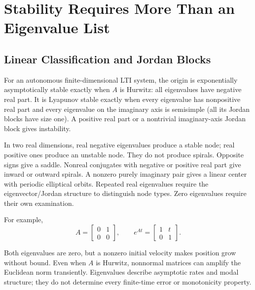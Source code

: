 \section{Stability Requires More Than an Eigenvalue List}
\label{sec:phase_portraits}
\label{thm:stability}
\label{thm:stability_classification}
\label{sec:equilibrium_summary}

\subsection{Linear Classification and Jordan Blocks}

For an autonomous finite-dimensional LTI system, the origin is exponentially asymptotically stable exactly when $A$ is Hurwitz: all eigenvalues have negative real part. It is Lyapunov stable exactly when every eigenvalue has nonpositive real part and every eigenvalue on the imaginary axis is semisimple (all its Jordan blocks have size one). A positive real part or a nontrivial imaginary-axis Jordan block gives instability.

In two real dimensions, real negative eigenvalues produce a stable node; real positive ones produce an unstable node. They do not produce spirals. Opposite signs give a saddle. Nonreal conjugates with negative or positive real part give inward or outward spirals. A nonzero purely imaginary pair gives a linear center with periodic elliptical orbits. Repeated real eigenvalues require the eigenvector/Jordan structure to distinguish node types. Zero eigenvalues require their own examination.

For example,
\begin{equation}
\label{eq:state_jordan_example}
 A=\begin{bmatrix}0&1\\0&0\end{bmatrix},\qquad
 e^{At}=\begin{bmatrix}1&t\\0&1\end{bmatrix}.
\end{equation}

Both eigenvalues are zero, but a nonzero initial velocity makes position grow without bound. Even when $A$ is Hurwitz, nonnormal matrices can amplify the Euclidean norm transiently. Eigenvalues describe asymptotic rates and modal structure; they do not determine every finite-time error or monotonicity property.

